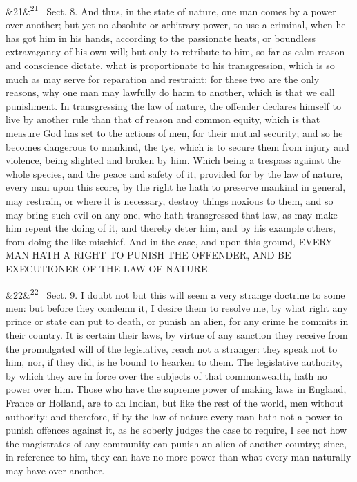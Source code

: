 \documentclass[12pt]{article}
\newcommand{\para}[1][]{\par\noindent\ifx&#1&\else\textsuperscript{\footnotesize #1}~\fi}
\begin{document}
\para[21] Sect. 8. And thus, in the state of nature, one man comes by a power over another; but yet no absolute or arbitrary power, to use a criminal, when he has got him in his hands, according to the passionate heats, or boundless extravagancy of his own will; but only to retribute to him, so far as calm reason and conscience dictate, what is proportionate to his transgression, which is so much as may serve for reparation and restraint: for these two are the only reasons, why one man may lawfully do harm to another, which is that we call punishment. In transgressing the law of nature, the offender declares himself to live by another rule than that of reason and common equity, which is that measure God has set to the actions of men, for their mutual security; and so he becomes dangerous to mankind, the tye, which is to secure them from injury and violence, being slighted and broken by him. Which being a trespass against the whole species, and the peace and safety of it, provided for by the law of nature, every man upon this score, by the right he hath to preserve mankind in general, may restrain, or where it is necessary, destroy things noxious to them, and so may bring such evil on any one, who hath transgressed that law, as may make him repent the doing of it, and thereby deter him, and by his example others, from doing the like mischief. And in the case, and upon this ground, EVERY MAN HATH A RIGHT TO PUNISH THE OFFENDER, AND BE EXECUTIONER OF THE LAW OF NATURE.

\para[22] Sect. 9. I doubt not but this will seem a very strange doctrine to some men: but before they condemn it, I desire them to resolve me, by what right any prince or state can put to death, or punish an alien, for any crime he commits in their country. It is certain their laws, by virtue of any sanction they receive from the promulgated will of the legislative, reach not a stranger: they speak not to him, nor, if they did, is he bound to hearken to them. The legislative authority, by which they are in force over the subjects of that commonwealth, hath no power over him. Those who have the supreme power of making laws in England, France or Holland, are to an Indian, but like the rest of the world, men without authority: and therefore, if by the law of nature every man hath not a power to punish offences against it, as he soberly judges the case to require, I see not how the magistrates of any community can punish an alien of another country; since, in reference to him, they can have no more power than what every man naturally may have over another.
\end{document}
